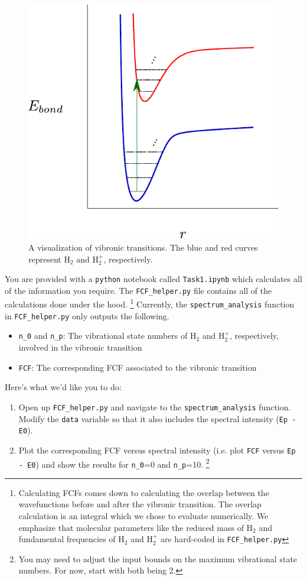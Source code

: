 \documentclass[12pt]{article}
\begin{document}
\begin{figure} 
    \begin{center}
        \includegraphics[width=0.5\linewidth]{../figures/potential_energy_curve.pdf}
    \end{center}
    \caption{A visualization of vibronic transitions. The blue and red curves represent H$_2$ and H$_2^+$, respectively.}
        \label{fig:visualize_vibronic}
\end{figure}

You are provided with a \texttt{python} notebook called \texttt{Task1.ipynb} which calculates all of the information you require. The \texttt{FCF\_helper.py} file contains all of the calculations done under the hood. \footnote{Calculating FCFs comes down to calculating the overlap between the wavefunctions before and after the vibronic transition. The overlap calculation is an integral which we chose to evaluate numerically. We emphasize that molecular parameters like the reduced mass of H$_2$ and fundamental frequencies of H$_2$ and H$_2^+$ are hard-coded in \texttt{FCF\_helper.py}} Currently, the \texttt{spectrum\_analysis} function in \texttt{FCF\_helper.py} only outputs the following.
\begin{itemize}
    \item \texttt{n\_0} and \texttt{n\_p}: The vibrational state numbers of H$_2$ and H$_2^+$, respectively, involved in the vibronic transition
    \item \texttt{FCF}: The corresponding FCF associated to the vibronic transition
\end{itemize}
Here's what we'd like you to do:
\begin{enumerate}
    \item Open up \texttt{FCF\_helper.py} and navigate to the \texttt{spectrum\_analysis} function. Modify the \texttt{data} variable so that it also includes the spectral intensity (\texttt{Ep - E0}).
    \item Plot the corresponding FCF versus spectral intensity (i.e. plot \texttt{FCF} versus \texttt{Ep - E0}) and show the results for \texttt{n\_0}=0 and \texttt{n\_p}=10. \footnote{You may need to adjust the input bounds on the maximum vibrational state numbers. For now, start with both being 2.}
\end{enumerate}
\end{document}
